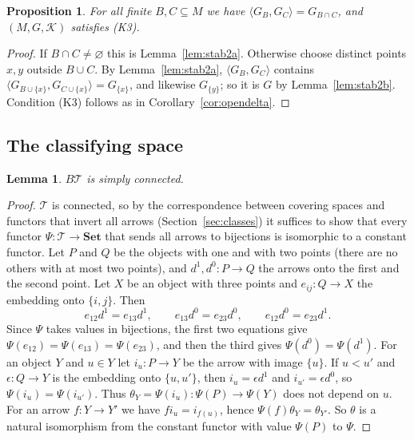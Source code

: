 \documentclass[11pt,a4paper]{article}
\newtheorem{proposition}[theorem]{Proposition}
\newtheorem{lemma}[theorem]{Lemma}
\theoremstyle{definition}
\newcommand{\Set}{\mathbf{Set}}
\newcommand{\K}{\mathcal{K}}
\begin{document}
\begin{proposition}\label{prop:open2}
For all finite $B,C\subseteq M$ we have $\langle G_B,G_C\rangle=G_{B\cap C}$, and
$(M,G,\K)$ satisfies \textup{(K3)}.
\end{proposition}

\begin{proof}
If $B\cap C\ne\varnothing$ this is Lemma~\ref{lem:stab2a}. Otherwise choose
distinct points $x,y$ outside $B\cup C$. By Lemma~\ref{lem:stab2a},
$\langle G_B,G_C\rangle$ contains
$\langle G_{B\cup\{x\}},G_{C\cup\{x\}}\rangle=G_{\{x\}}$, and likewise
$G_{\{y\}}$; so it is $G$ by Lemma~\ref{lem:stab2b}. Condition (K3) follows as
in Corollary~\ref{cor:opendelta}.
\end{proof}

\subsection{The classifying space}

\begin{lemma}\label{lem:pi1}
$B\mathcal T$ is simply connected.
\end{lemma}

\begin{proof}
$\mathcal T$ is connected, so by the correspondence between covering spaces
and functors that invert all arrows (Section~\ref{sec:classes}) it
suffices to show that every functor $\Psi\colon\mathcal T\to\Set$ that sends
all arrows to bijections is isomorphic to a constant functor. Let $P$ and
$Q$ be the objects with one and with two points (there are no others with at
most two points), and $d^1,d^0\colon P\to Q$ the arrows onto the first and the
second point. Let $X$ be an object with three points and
$e_{ij}\colon Q\to X$ the embedding onto $\{i,j\}$. Then
\[
 e_{12}d^1=e_{13}d^1,\qquad e_{13}d^0=e_{23}d^0,\qquad e_{12}d^0=e_{23}d^1 .
\]
Since $\Psi$ takes values in bijections, the first two equations give
$\Psi(e_{12})=\Psi(e_{13})=\Psi(e_{23})$, and then the third gives
$\Psi(d^0)=\Psi(d^1)$. For an object $Y$ and $u\in Y$ let $i_u\colon P\to Y$ be
the arrow with image $\{u\}$. If $u<u'$ and $\epsilon\colon Q\to Y$ is the
embedding onto $\{u,u'\}$, then $i_u=\epsilon d^1$ and $i_{u'}=\epsilon d^0$, so
$\Psi(i_u)=\Psi(i_{u'})$. Thus $\theta_Y=\Psi(i_u)\colon\Psi(P)\to\Psi(Y)$ does
not depend on $u$. For an arrow $f\colon Y\to Y'$ we have $fi_u=i_{f(u)}$,
hence $\Psi(f)\theta_Y=\theta_{Y'}$. So $\theta$ is a natural isomorphism from
the constant functor with value $\Psi(P)$ to $\Psi$.
\end{proof}
\end{document}
